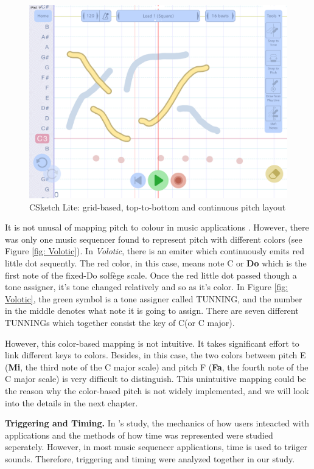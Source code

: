 \bigskip
\begin{figure}[h]
  \includegraphics[width=12 cm]{images/CSketch_Lite.PNG}
  \centering
  \caption{CSketch Lite: grid-based, top-to-bottom and continuous pitch layout}
  \label{fig: CSketch}
\end{figure}
\bigskip

It is not unusal of mapping pitch to colour in music applications \citep{Reference14}. However, there was only one music sequencer found to represent pitch with different colors (see Figure \ref{fig: Volotic}). In \textit{Volotic}, there is an emiter which continuously emits red little dot sequently. The red color, in this case, means note C or \textbf{Do} which is the first note of the fixed-Do solfège scale. Once the red little dot passed though a tone assigner, it's tone changed relatively and so as it's color. In Figure \ref{fig: Volotic}, the green symbol is a tone assigner called TUNNING, and the number in the middle denotes what note it is going to assign. There are seven different TUNNINGs which together consist the key of C(or C major).

However, this color-based mapping is not intuitive. It takes significant effort to link different keys to colors. Besides, in this case, the two colors between pitch E (\textbf{Mi}, the third note of the C major scale) and pitch F (\textbf{Fa}, the fourth note of the C major scale) is very difficult to distinguish. This unintuitive mapping could be the reason why the color-based pitch is not widely implemented, and we will look into the details in the next chapter.

\textbf{Triggering and Timing.} In \citeauthor{Reference14}'s study, the mechanics of how users inteacted with applications and the methods of how time was represented were studied seperately. However, in most music sequencer applications, time is used to triiger sounds. Therefore, triggering and timing were analyzed together in our study.

